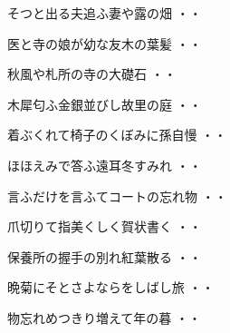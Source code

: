\begin{shiika}そつと出る夫追ふ妻や露の畑
\hfill{・・}\end{shiika}
\vspace{0.6cm}
\begin{shiika}医と寺の娘が幼な友木の葉髪
\hfill{・・}\end{shiika}
\vspace{0.6cm}
\begin{shiika}秋風や札所の寺の大礎石
\hfill{・・}\end{shiika}
\vspace{0.6cm}
\begin{shiika}木犀匂ふ金銀並びし故里の庭
\hfill{・・}\end{shiika}
\vspace{0.6cm}
\begin{shiika}着ぶくれて椅子のくぼみに孫自慢
\hfill{・・}\end{shiika}
\vspace{0.6cm}
\begin{shiika}ほほえみで答ふ遠耳冬すみれ
\hfill{・・}\end{shiika}
\vspace{0.6cm}
\begin{shiika}言ふだけを言ふてコートの忘れ物
\hfill{・・}\end{shiika}
\vspace{0.6cm}
\begin{shiika}爪切りて指美くしく賀状書く
\hfill{・・}\end{shiika}
\vspace{0.6cm}
\begin{shiika}保養所の握手の別れ紅葉散る
\hfill{・・}\end{shiika}
\vspace{0.6cm}
\begin{shiika}晩菊にそとさよならをしばし旅
\hfill{・・}\end{shiika}
\vspace{0.6cm}
\begin{shiika}物忘れめつきり増えて年の暮
\hfill{・・}\end{shiika}
\vspace{0.6cm}
